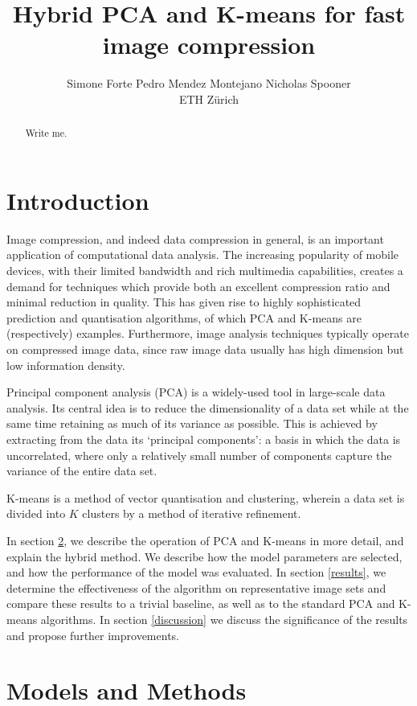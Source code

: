 \documentclass[10pt,conference,compsocconf]{IEEEtran}
\title{Hybrid PCA and K-means for fast image compression}
\author{Simone Forte \qquad Pedro Mendez Montejano \qquad Nicholas Spooner \\
		ETH Z\"urich}
\begin{document}
\maketitle

\begin{abstract}
Write me.
\end{abstract}

\section{Introduction}
Image compression, and indeed data compression in general, is an important application of computational data analysis. The increasing popularity of mobile devices, with their limited bandwidth and rich multimedia capabilities, creates a demand for techniques which provide both an excellent compression ratio and minimal reduction in quality. This has given rise to highly sophisticated prediction and quantisation algorithms, of which PCA and K-means are (respectively) examples. Furthermore, image analysis techniques typically operate on compressed image data, since raw image data usually has high dimension but low information density.

Principal component analysis (PCA) is a widely-used tool in large-scale data analysis. Its central idea is to reduce the dimensionality of a data set while at the same time retaining as much of its variance as possible. This is achieved by extracting from the data its `principal components': a basis in which the data is uncorrelated, where only a relatively small number of components capture the variance of the entire data set.

K-means is a method of vector quantisation and clustering, wherein a data set is divided into $K$ clusters by a method of iterative refinement.

In section \ref{models}, we describe the operation of PCA and K-means in more detail, and explain the hybrid method. We describe how the model parameters are selected, and how the performance of the model was evaluated. In section \ref{results}, we determine the effectiveness of the algorithm on representative image sets and compare these results to a trivial baseline, as well as to the standard PCA and K-means algorithms. In section \ref{discussion} we discuss the significance of the results and propose further improvements.

\section{Models and Methods}
\label{models}
\end{document}
